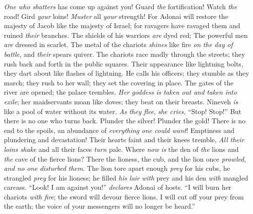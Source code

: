 \begin{biblechapter} %
 \textit{One who shatters} has come up against you! 
Guard \textit{the} fortification! 
Watch \textit{the} road! 
Gird \textit{your} loins! 
\textit{Muster} all \textit{your} strength!
\verse For Adonai will restore the majesty of Jacob 
like the majesty of Israel; 
for ravagers have ravaged them 
and ruined \textit{their} branches.
 The shields of his warriors \textit{are} dyed red; 
The powerful men \textit{are} dressed in scarlet. 
The metal of the chariots \textit{shines} like fire \textit{on the day of battle}, 
and \textit{their} spears quiver.
\verse The chariots race madly through the streets; 
they rush back and forth in the public squares. 
Their appearance like lightning bolts, 
they dart about like flashes of lightning.
\verse He calls his officers; 
they stumble as they march; 
they rush to her wall; 
they set the covering in place.
\verse The gates of the river are opened; 
the palace trembles.
\verse \textit{Her goddess is taken out and taken into exile}; 
her maidservants moan like doves; 
they beat on their breasts.
\verse Nineveh \textit{is} like a pool of water without its water. 
\textit{As they flee}, \textit{she cries,} “Stop! Stop!” 
But there is no one who turns back.
\verse Plunder the silver! Plunder the gold! 
There is no end to the spoils, 
an abundance of \textit{everything one could want}!
\verse Emptiness and plundering and devastation! 
Their hearts faint and their knees tremble, 
\textit{All their loins shake} and all their faces \textit{turn} pale.
 Where \textit{now} \textit{is} the den of \textit{the} lions 
and \textit{the} cave of the fierce lions? 
There the lioness, the cub, and the lion once \textit{prowled}, 
\textit{and no one disturbed them}.
\verse The lion tore apart enough \textit{prey} for his cubs, 
he strangled \textit{prey} for his lioness; 
he filled \textit{his lair} \textit{with} prey 
and his den \textit{with} mangled carcass.
\verse “Look! I am against you!” \textit{declares} Adonai of hosts. 
“I will burn her chariots \textit{with fire}; 
the sword will devour fierce lions. 
I will cut off your prey from the earth; 
the voice of your messengers will no longer be heard.”
\end{biblechapter}


